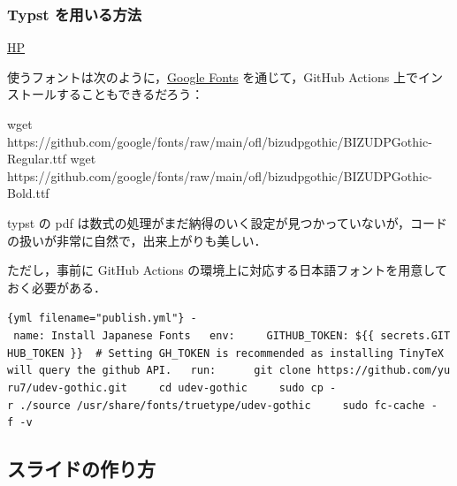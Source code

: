 \documentclass[
]{ltjsarticle}
\newenvironment{Shaded}{\begin{snugshade}}{\end{snugshade}}
\newcommand{\FunctionTok}[1]{\textcolor[rgb]{0.28,0.35,0.67}{#1}}
\newcommand{\NormalTok}[1]{\textcolor[rgb]{0.00,0.23,0.31}{#1}}
\begin{document}
\subsubsection{Typst
を用いる方法}\label{typst-ux3092ux7528ux3044ux308bux65b9ux6cd5}

\href{https://typst.app/}{HP}

使うフォントは次のように，\href{https://fonts.google.com/specimen/BIZ+UDPGothic}{Google
Fonts} を通じて，GitHub Actions 上でインストールすることもできるだろう：

\begin{Shaded}
\begin{Highlighting}[]
\FunctionTok{wget}\NormalTok{ https://github.com/google/fonts/raw/main/ofl/bizudpgothic/BIZUDPGothic{-}Regular.ttf}
\FunctionTok{wget}\NormalTok{ https://github.com/google/fonts/raw/main/ofl/bizudpgothic/BIZUDPGothic{-}Bold.ttf}
\end{Highlighting}
\end{Shaded}

typst の pdf
は数式の処理がまだ納得のいく設定が見つかっていないが，コードの扱いが非常に自然で，出来上がりも美しい．

ただし，事前に GitHub Actions
の環境上に対応する日本語フォントを用意しておく必要がある．

\texttt{\{yml\ filename="publish.yml"\}\ -\ name:\ Install\ Japanese\ Fonts\ \ \ env:\ \ \ \ \ GITHUB\_TOKEN:\ \$\{\{\ secrets.GITHUB\_TOKEN\ \}\}\ \ \#\ Setting\ GH\_TOKEN\ is\ recommended\ as\ installing\ TinyTeX\ will\ query\ the\ github\ API.\ \ \ run:\ \textbar{}\ \ \ \ \ git\ clone\ https://github.com/yuru7/udev-gothic.git\ \ \ \ \ cd\ udev-gothic\ \ \ \ \ sudo\ cp\ -r\ ./source\ /usr/share/fonts/truetype/udev-gothic\ \ \ \ \ sudo\ fc-cache\ -f\ -v}

\subsection{スライドの作り方}\label{ux30b9ux30e9ux30a4ux30c9ux306eux4f5cux308aux65b9}
\end{document}
